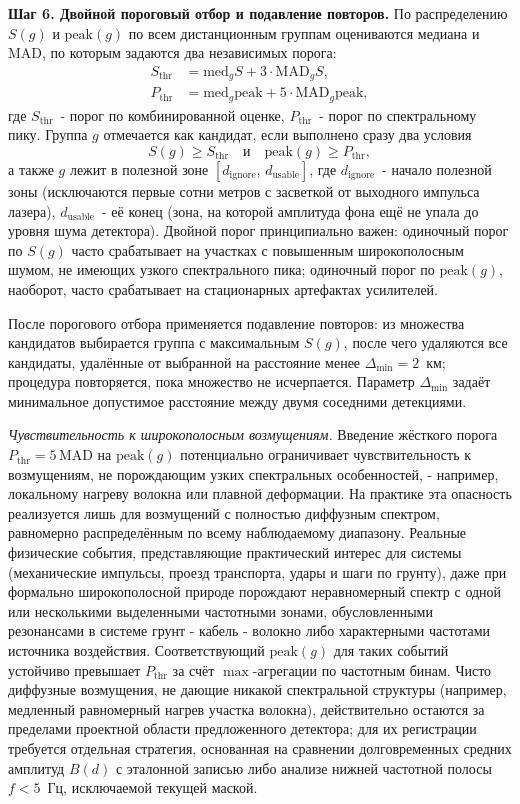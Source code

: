 \documentclass[12pt,a4paper]{extarticle}
\begin{document}
\textbf{Шаг 6. Двойной пороговый отбор и подавление повторов.} По распределению $S(g)$ и $\mathrm{peak}(g)$ по всем дистанционным группам оцениваются медиана и MAD, по которым задаются два независимых порога:
\begin{align}
  S_\text{thr} &= \mathrm{med}_g S + 3 \cdot \mathrm{MAD}_g S, \\
  P_\text{thr} &= \mathrm{med}_g \mathrm{peak} + 5 \cdot \mathrm{MAD}_g \mathrm{peak},
\end{align}
где $S_\text{thr}$~- порог по комбинированной оценке, $P_\text{thr}$~- порог по спектральному пику. Группа $g$ отмечается как кандидат, если выполнено сразу два условия
\[
  S(g) \ge S_\text{thr} \quad \text{и} \quad \mathrm{peak}(g) \ge P_\text{thr},
\]
а также $g$ лежит в полезной зоне $[d_\text{ignore},\, d_\text{usable}]$, где $d_\text{ignore}$~- начало полезной зоны (исключаются первые сотни метров с засветкой от выходного импульса лазера), $d_\text{usable}$~- её конец (зона, на которой амплитуда фона ещё не упала до уровня шума детектора). Двойной порог принципиально важен: одиночный порог по $S(g)$ часто срабатывает на участках с повышенным широкополосным шумом, не имеющих узкого спектрального пика; одиночный порог по $\mathrm{peak}(g)$, наоборот, часто срабатывает на стационарных артефактах усилителей.

После порогового отбора применяется подавление повторов: из множества кандидатов выбирается группа с максимальным $S(g)$, после чего удаляются все кандидаты, удалённые от выбранной на расстояние менее $\Delta_\text{min} = 2$~км; процедура повторяется, пока множество не исчерпается. Параметр $\Delta_\text{min}$ задаёт минимальное допустимое расстояние между двумя соседними детекциями.

\textit{Чувствительность к широкополосным возмущениям.} Введение жёсткого порога $P_\text{thr} = 5\,\mathrm{MAD}$ на $\mathrm{peak}(g)$ потенциально ограничивает чувствительность к возмущениям, не порождающим узких спектральных особенностей, - например, локальному нагреву волокна или плавной деформации. На практике эта опасность реализуется лишь для возмущений с полностью диффузным спектром, равномерно распределённым по всему наблюдаемому диапазону. Реальные физические события, представляющие практический интерес для системы (механические импульсы, проезд транспорта, удары и шаги по грунту), даже при формально широкополосной природе порождают неравномерный спектр с одной или несколькими выделенными частотными зонами, обусловленными резонансами в системе грунт - кабель - волокно либо характерными частотами источника воздействия. Соответствующий $\mathrm{peak}(g)$ для таких событий устойчиво превышает $P_\text{thr}$ за счёт $\max$-агрегации по частотным бинам. Чисто диффузные возмущения, не дающие никакой спектральной структуры (например, медленный равномерный нагрев участка волокна), действительно остаются за пределами проектной области предложенного детектора; для их регистрации требуется отдельная стратегия, основанная на сравнении долговременных средних амплитуд $B(d)$ с эталонной записью либо анализе нижней частотной полосы $f < 5$~Гц, исключаемой текущей маской.
\end{document}
